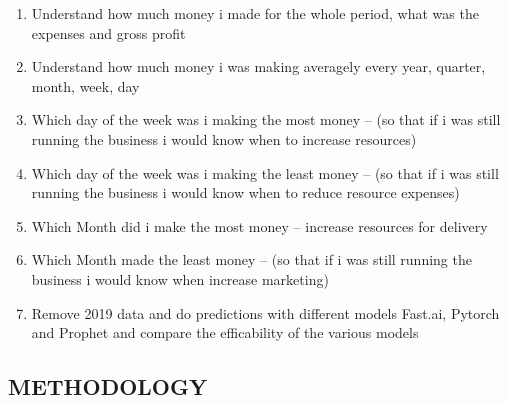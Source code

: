 \documentclass[11pt]{article}
\providecommand{\tightlist}{%
      \setlength{\itemsep}{0pt}\setlength{\parskip}{0pt}}
\begin{document}
    \begin{enumerate}
\def\labelenumi{\arabic{enumi}.}
\tightlist
\item
  Understand how much money i made for the whole period, what was the
  expenses and gross profit
\item
  Understand how much money i was making averagely every year, quarter,
  month, week, day
\item
  Which day of the week was i making the most money -- (so that if i was
  still running the business i would know when to increase resources)
\item
  Which day of the week was i making the least money -- (so that if i
  was still running the business i would know when to reduce resource
  expenses)
\item
  Which Month did i make the most money -- increase resources for
  delivery
\item
  Which Month made the least money -- (so that if i was still running
  the business i would know when increase marketing)
\item
  Remove 2019 data and do predictions with different models Fast.ai,
  Pytorch and Prophet and compare the efficability of the various models
\end{enumerate}

    \hypertarget{methodology}{%
\subsection{METHODOLOGY}\label{methodology}}
\end{document}
